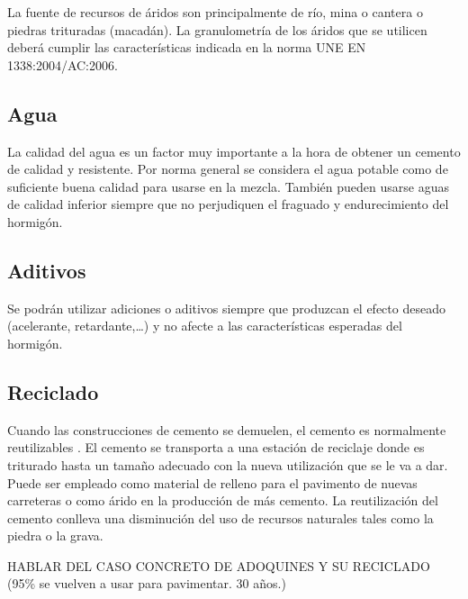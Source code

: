 La fuente de recursos de áridos son principalmente de río, mina o cantera o piedras trituradas (macadán). La granulometría de los áridos que se utilicen deberá cumplir las características indicada en la norma UNE EN 1338:2004/AC:2006.

\subsection{Agua}
La calidad del agua es un factor muy importante a la hora de obtener un cemento de calidad y resistente. Por norma general se considera el agua potable como de suficiente buena calidad para usarse en la mezcla. También pueden usarse aguas de calidad inferior siempre que no perjudiquen el fraguado y endurecimiento del hormigón.

\subsection{Aditivos}
Se podrán utilizar adiciones o aditivos siempre que produzcan el efecto deseado (acelerante, retardante,\ldots) y no afecte a las características esperadas del hormigón.

\subsection{Reciclado}
Cuando las construcciones de cemento se demuelen, el cemento es normalmente reutilizables \cite{jsjunnesson}. El cemento se transporta a una estación de reciclaje donde es triturado hasta un tamaño adecuado con la nueva utilización que se le va a dar. Puede ser empleado como material de relleno para el pavimento de nuevas carreteras o como árido en la producción de más cemento. La reutilización del cemento conlleva una disminución del uso de recursos naturales tales como la piedra o la grava.

HABLAR DEL CASO CONCRETO DE ADOQUINES Y SU RECICLADO (95\% se vuelven a usar para pavimentar. 30 años.)
